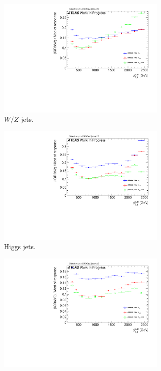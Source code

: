 \begin{figure}
    \centering
    \begin{subfigure}[b]{0.45\textwidth}
  \centering
      \includegraphics[width=0.9\textwidth]{jet_part/mtas/71graphcftr_h_JetRatio_mJ12CALOIQRoMWZ.pdf}
  \caption[$\mtas$ for boosted $W/Z$]{$W/Z$ jets.}
  \label{fig:mtas2}
    \end{subfigure}%
    \begin{subfigure}[b]{0.45\textwidth}
  \centering
      \includegraphics[width=0.9\textwidth]{jet_part/mtas/71graphcftr_h_JetRatio_mJ12CALOIQRoMHiggs.pdf}
  \caption[$\mtas$ for boosted Higgs]{Higgs jets.}
  \label{fig:mtas4}
    \end{subfigure}
 \begin{subfigure}[b]{0.45\textwidth}
  \centering
      \includegraphics[width=0.9\textwidth]{jet_part/mtas/71graphcftr_h_JetRatio_mJ12CALOIQRoMTops.pdf}

\end{subfigure}
\end{figure}
